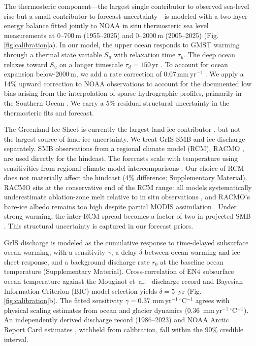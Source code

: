 \documentclass[12pt]{article}
\begin{document}
The thermosteric component---the largest single contributor to observed sea-level rise but a small contributor to forecast uncertainty---is modeled with a two-layer energy balance \citep{Geoffroy2013} fitted jointly to NOAA in situ thermosteric sea level measurements at 0--700\,m (1955--2025) and 0--2000\,m (2005--2025) \citep{Levitus2012} (Fig. \ref{fig:calibration}a). In our model, the upper ocean responds to GMST warming through a thermal state variable $S_u$ with relaxation time $\tau_u$. The deep ocean relaxes toward $S_u$ on a longer timescale $\tau_d = 150$\,yr \citep{Geoffroy2013}. To account for ocean expansion below-2000\,m, we add a rate correction of 0.07\,mm\,yr$^{-1}$ \citep{Purkey2010}. We apply a 14\% upward correction to NOAA observations to account for the documented low bias arising from the interpolation of sparse hydrographic profiles, primarily in the Southern Ocean \citep{Li2022}. We carry a 5\% residual structural uncertainty in the thermosteric fits and forecast.

The Greenland Ice Sheet is currently the largest land-ice contributor \citep{Frederikse2020}, but not the largest source of land-ice uncertainty. We treat GrIS SMB and ice discharge separately. SMB observations from a regional climate model (RCM), RACMO \citep{Mouginot2019, Noel2018}, are used directly for the hindcast. The forecasts scale with temperature using sensitivities from regional climate model intercomparisons \citep{Fettweis2020, Noel2021}. Our choice of RCM does not materially affect the hindcast (4\% difference; Supplementary Material). RACMO sits at the conservative end of the RCM range: all models systematically underestimate ablation-zone melt relative to in situ observations \citep{Fettweis2020}, and RACMO's bare-ice albedo remains too high despite partial MODIS assimilation \citep{Alexander2016, Noel2019}. Under strong warming, the inter-RCM spread becomes a factor of two in projected SMB \citep{Glaude2024}. This structural uncertainty is captured in our forecast priors.

GrIS discharge is modeled as the cumulative response to time-delayed subsurface ocean warming, with a sensitivity $\gamma$, a delay $\delta$ between ocean warming and ice sheet response, and a background discharge rate $r_0$ at the baseline ocean temperature (Supplementary Material). Cross-correlation of EN4 subsurface ocean temperature \citep{Good2013} against the Mouginot et~al.~\citep{Mouginot2019} discharge record and Bayesian Information Criterion (BIC) model selection yields $\delta = 5$~yr (Fig. \ref{fig:calibration}b). The fitted sensitivity $\gamma = 0.37$ mm\,yr$^{-1}\,^\circ$C$^{-1}$ agrees with physical scaling estimates from ocean and glacier dynamics (0.36~mm\,yr$^{-1}$\,$^\circ$C$^{-1}$). An independently derived discharge record (1986--2023) \citep{Mankoff2021} and NOAA Arctic Report Card estimates \citep{Poinar2026}, withheld from calibration, fall within the 90\% credible interval. 
\end{document}
